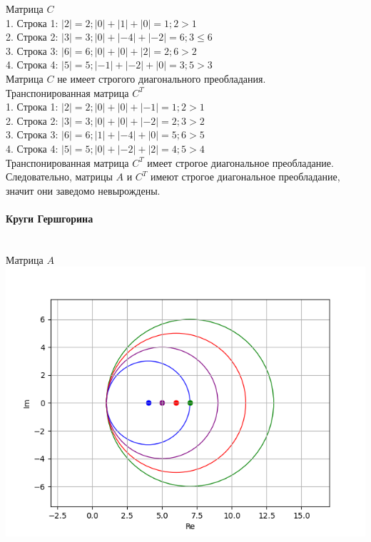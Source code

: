 \documentclass[a4paper,14pt]{article}
\begin{document}
Матрица $C$\\
1. Строка 1: $|2| = 2; |0| + |1| + |0| = 1; 2 > 1$\\
2. Строка 2: $|3| = 3; |0| + |-4| + |-2| = 6; 3 \leq 6$\\
3. Строка 3: $|6| = 6; |0| + |0| + |2| = 2; 6 > 2$\\
4. Строка 4: $|5| = 5; |-1| + |-2| + |0| = 3; 5>3$\\
Матрица $C$ не имеет строгого диагонального преобладания.\\

Транспонированная матрица $C^T$\\
1. Строка 1: $|2| = 2; |0| + |0| + |-1| = 1; 2>1$\\
2. Строка 2: $|3| = 3; |0| + |0| + |-2| = 2; 3>2$\\
3. Строка 3: $|6| = 6; |1| + |-4| + |0| = 5; 6 > 5$\\
4. Строка 4: $|5| = 5; |0| + |-2| + |2| = 4; 5>4$\\
Транспонированная матрица $C^T$  имеет строгое диагональное преобладание.\\

Следовательно, матрицы $A$ и $C^T$ имеют строгое диагональное преобладание, значит они заведомо невырождены.

\paragraph{Круги Гершгорина\\\\}

Матрица $A$\\
\includegraphics{matrix_a.png}
\end{document}
